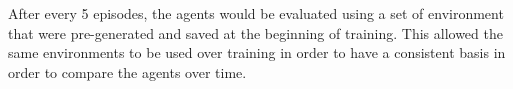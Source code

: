 After every 5 episodes, the agents would be evaluated using a set of environment that were pre-generated and
saved at the beginning of training. This allowed the same environments to be used over training in order to have a
consistent basis in order to compare the agents over time.
%
%
